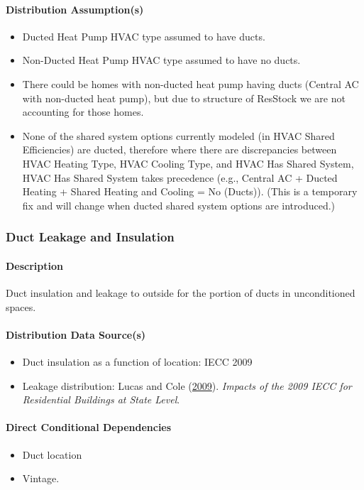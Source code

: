 \paragraph{Distribution Assumption(s)}
\begin{itemize}
    \item Ducted Heat Pump HVAC type assumed to have ducts.
    \item Non-Ducted Heat Pump HVAC type assumed to have no ducts.
    \item There could be homes with non-ducted heat pump having ducts (Central AC with non-ducted heat pump), but due to structure of ResStock we are not accounting for those homes.
    \item None of the shared system options currently modeled (in HVAC Shared Efficiencies) are ducted, therefore where there are discrepancies between HVAC Heating Type, HVAC Cooling Type, and HVAC Has Shared System, HVAC Has Shared System takes precedence (e.g., Central AC + Ducted Heating + Shared Heating and Cooling = No (Ducts)). (This is a temporary fix and will change when ducted shared system options are introduced.)
\end{itemize}
 

\subsubsection{Duct Leakage and Insulation}

\paragraph{Description}
Duct insulation and leakage to outside for the portion of ducts in unconditioned spaces.
\paragraph{Distribution Data Source(s)}
\begin{itemize}
\item Duct insulation as a function of location: IECC 2009 
\item Leakage 
distribution: Lucas and Cole (\href{https://www.pnnl.gov/main/publications/external/technical_reports/PNNL-18545.pdf}{2009}). \textit{Impacts of the 2009 IECC for Residential Buildings at State Level}. 
\end{itemize}
\paragraph{Direct Conditional Dependencies}
\begin{itemize}
    \item Duct location
    \item Vintage.
\end{itemize}
